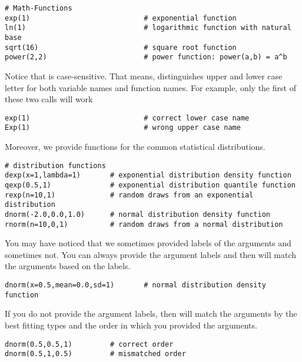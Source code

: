 {\tt \begin{snugshade*}
\begin{lstlisting}    
# Math-Functions
exp(1)                           # exponential function
ln(1)                            # logarithmic function with natural base
sqrt(16)                         # square root function 
power(2,2)                       # power function: power(a,b) = a^b
\end{lstlisting}
\end{snugshade*}}
Notice that \Rev is case-sensitive. That means, \Rev distinguishes upper and lower case letter for both variable names and function names. For example, only the first of these two calls will work
{\tt \begin{snugshade*}
\begin{lstlisting}    
exp(1)                           # correct lower case name
Exp(1)                           # wrong upper case name
\end{lstlisting}
\end{snugshade*}}
Moreover, we provide functions for the common statistical distributions.
{\tt \begin{snugshade*}
\begin{lstlisting}    
# distribution functions
dexp(x=1,lambda=1)       # exponential distribution density function
qexp(0.5,1)              # exponential distribution quantile function
rexp(n=10,1)             # random draws from an exponential distribution
dnorm(-2.0,0.0,1.0)      # normal distribution density function
rnorm(n=10,0,1)          # random draws from a normal distribution
\end{lstlisting}
\end{snugshade*}}
You may have noticed that we sometimes provided labels of the arguments and sometimes not. 
You can always provide the argument labels and then \RevBayes will match the arguments based on the labels.
{\tt \begin{snugshade*}
\begin{lstlisting}    
dnorm(x=0.5,mean=0.0,sd=1)       # normal distribution density function
\end{lstlisting}
\end{snugshade*}}
If you do not provide the argument labels, then \RevBayes  will match the arguments by the best fitting types and the order in which you provided the arguments.
{\tt \begin{snugshade*}
\begin{lstlisting}    
dnorm(0.5,0.5,1)         # correct order
dnorm(0.5,1,0.5)         # mismatched order
\end{lstlisting}
\end{snugshade*}}
